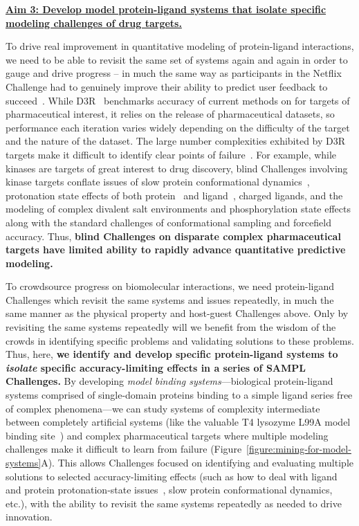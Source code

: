 \documentclass[11pt]{article}
\begin{document}
\textbf{\underline{Aim 3: Develop model protein-ligand systems that isolate specific modeling challenges of drug targets.}}

To drive real improvement in quantitative modeling of protein-ligand interactions, we need to be able to revisit the same set of systems again and again in order to gauge and drive progress -- in much the same way as participants in the Netflix Challenge had to genuinely improve their ability to predict user feedback to succeed~\cite{Bell:2010:CHANCE}.
While D3R~\cite{Gathiaka:2016:JComputAidedMolDes} benchmarks accuracy of current methods on for targets of pharmaceutical interest, it relies on the release of pharmaceutical datasets, so performance each iteration varies widely depending on the difficulty of the target and the nature of the dataset.
The large number complexities exhibited by D3R targets make it difficult to identify clear points of failure~\cite{ignjatovic_binding-affinity_2016, deng_large_2016, sunseri_d3r_2016, Gathiaka:2016:JComputAidedMolDes}.
For example, while kinases are targets of great interest to drug discovery, blind Challenges involving kinase targets conflate issues of slow protein conformational dynamics~\cite{Lin:2013:Proc.Natl.Acad.Sci.}, protonation state effects of both protein~\cite{Shan:2009:PNAS} and ligand~\cite{Szakacs:2005:JournalofMedicinalChemistry,Grante:2014:SpectrochimicaActaPartA:MolecularandBiomolecularSpectroscopy}, charged ligands, and the modeling of complex divalent salt environments and phosphorylation state effects along with the standard challenges of conformational sampling and forcefield accuracy.
Thus, {\bf blind Challenges on disparate complex pharmaceutical targets have limited ability to rapidly advance quantitative predictive modeling.}

To crowdsource progress on biomolecular interactions, we need protein-ligand Challenges which revisit the same systems and issues repeatedly, in much the same manner as the physical property and host-guest Challenges above.
Only by revisiting the same systems repeatedly will we benefit from the wisdom of the crowds in identifying specific problems and validating solutions to these problems. 
Thus, here, {\bf we identify and develop specific protein-ligand systems to \emph{isolate} specific accuracy-limiting effects in a series of SAMPL Challenges.}
By developing \emph{model binding systems}---biological protein-ligand systems comprised of single-domain proteins binding to a simple ligand series free of complex phenomena---we can study systems of complexity intermediate between completely artificial systems (like the valuable T4 lysozyme L99A model binding site~\cite{mobley_predicting_2007,merski_homologous_2015, Mobley:2017:AnnualReviewofBiophysics}) and complex pharmaceutical targets where multiple modeling challenges make it difficult to learn from failure (Figure~\ref{figure:mining-for-model-systems}A).
This allows Challenges focused on identifying and evaluating multiple solutions to selected accuracy-limiting effects (such as how to deal with ligand and protein protonation-state issues~\cite{Onufriev:2013:QuarterlyReviewsofBiophysics}, slow protein conformational dynamics, etc.), with the ability to revisit the same systems repeatedly as needed to drive innovation.
\end{document}
